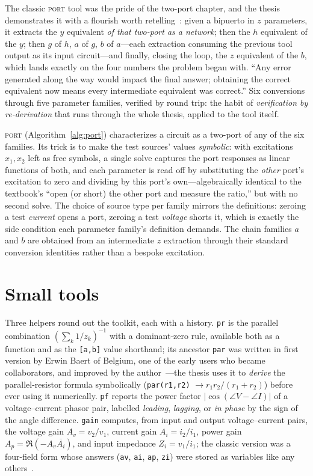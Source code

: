 \documentclass[11pt,oneside]{report}
\newcommand{\kw}[1]{\textsc{#1}}
\newcommand{\code}[1]{\texttt{#1}}
\begin{document}
The classic \kw{port} tool was the pride of the two-port chapter,
and the thesis demonstrates it with a flourish worth
retelling~\cite[\S7.6--7.7]{thesis2000}: given a bipuerto in $z$
parameters, it extracts the $y$ equivalent \emph{of that two-port as
a network}; then the $h$ equivalent of the $y$; then $g$ of $h$, $a$
of $g$, $b$ of $a$---each extraction consuming the previous tool
output as its input circuit---and finally, closing the loop, the $z$
equivalent of the $b$, which lands exactly on the four numbers the
problem began with. ``Any error generated along the way would impact
the final answer; obtaining the correct equivalent now means every
intermediate equivalent was correct.'' Six conversions through five
parameter families, verified by round trip: the habit of
\emph{verification by re-derivation} that runs through the whole
thesis, applied to the tool itself.

\kw{port} (Algorithm~\ref{alg:port}) characterizes a circuit as a
two-port of any of the six families. Its trick is to make the test
sources' values \emph{symbolic}: with excitations $x_1, x_2$ left as
free symbols, a single solve captures the port responses as linear
functions of both, and each parameter is read off by substituting the
\emph{other} port's excitation to zero and dividing by this port's
own---algebraically identical to the textbook's ``open (or short) the
other port and measure the ratio,'' but with no second solve. The
choice of source type per family mirrors the definitions: zeroing a
test \emph{current} opens a port, zeroing a test \emph{voltage} shorts
it, which is exactly the side condition each parameter family's
definition demands. The chain families $a$ and $b$ are obtained from
an intermediate $z$ extraction through their standard conversion
identities rather than a bespoke excitation.

\section{Small tools}
\label{sec:smalltools}

Three helpers round out the toolkit, each with a history. \code{pr}
is the parallel combination $(\sum_k 1/z_k)^{-1}$ with a
dominant-zero rule, available both as a function and as the
\code{[a,b]} value shorthand; its ancestor \code{par} was written in
first version by Erwin Baert of Belgium, one of the early users who
became collaborators, and improved by the
author~\cite[\S5.4]{thesis2000}---the thesis uses it to
\emph{derive} the parallel-resistor formula symbolically
(\code{par(r1,r2)} $\to r_1 r_2/(r_1+r_2)$) before ever using it
numerically. \code{pf} reports the power factor
$|\cos(\angle V - \angle I)|$ of a voltage--current phasor pair,
labelled \emph{leading}, \emph{lagging}, or \emph{in phase} by the
sign of the angle difference. \code{gain} computes, from input and
output voltage--current pairs, the voltage gain $A_v = v_2/v_1$,
current gain $A_i = i_2/i_1$, power gain
$A_p = \Re(-A_v \overline{A_i})$, and input impedance
$Z_i = v_1/i_1$; the classic version was a four-field form whose
answers (\code{av}, \code{ai}, \code{ap}, \code{zi}) were stored as
variables like any others~\cite[\S7.4]{thesis2000}.
\end{document}
